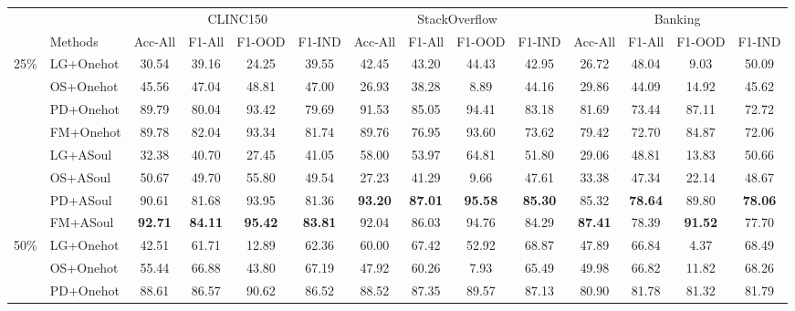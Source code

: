 \documentclass[11pt]{article}
\begin{document}
\begin{table}[t]
\small
\setlength\tabcolsep{1.5pt} %
\begin{tabular}{cl|cccc|cccc|cccc}
\toprule
\multirow{2}{*}{}  &  &\multicolumn{4}{c|}{CLINC150}  &  \multicolumn{4}{c|}{StackOverflow}  &\multicolumn{4}{c}{Banking}     \\
& Methods  & Acc-All & F1-All & F1-OOD & F1-IND &  Acc-All &   F1-All & F1-OOD & F1-IND & Acc-All &  F1-All & F1-OOD & F1-IND \\
\midrule
\multirow{8}{*}{25\%} 
  & LG+Onehot  & 30.54      & 39.16   & 24.25 & 39.55   & 42.45   & 43.20  & 44.43  & 42.95  & 26.72    & 48.04  & 9.03  & 50.09    \\
  & OS+Onehot  & 45.56      & 47.04   & 48.81 & 47.00   & 26.93   & 38.28  & 8.89   & 44.16  & 29.86    & 44.09  & 14.92 & 45.62   \\
  & PD+Onehot  & 89.79      & 80.04   & 93.42 & 79.69   & 91.53   & 85.05  & 94.41  & 83.18  & 81.69    & 73.44  & 87.11 & 72.72   \\
  & FM+Onehot  & 89.78      & 82.04   & 93.34 & 81.74   & 89.76   & 76.95  & 93.60  & 73.62  & 79.42    & 72.70  & 84.87 & 72.06    \\
\cmidrule{2-14}
  & LG+ASoul & 32.38          & 40.70  & 27.45 & 41.05    & 58.00          & 53.97          & 64.81          & 51.80          & 29.06          & 48.81       & 13.83 & 50.66   \\
  & OS+ASoul & 50.67          & 49.70  & 55.80 & 49.54    & 27.23          & 41.29          & 9.66           & 47.61          & 33.38          & 47.34     & 22.14 & 48.67     \\
  & PD+ASoul & 90.61          & 81.68  & 93.95 & 81.36    & \textbf{93.20} & \textbf{87.01} & \textbf{95.58} & \textbf{85.30} & 85.32          & \textbf{78.64} & 89.80 & \textbf{78.06}\\
  & FM+ASoul & \textbf{92.71} & \textbf{84.11} & \textbf{95.42} & \textbf{83.81} & 92.04          & 86.03   & 94.76 & 84.29   & \textbf{87.41} & 78.39     & \textbf{91.52} & 77.70     \\
\midrule
\midrule
\multirow{8}{*}{50\%} 
  & LG+Onehot & 42.51 & 61.71 & 12.89 & 62.36 & 60.00 & 67.42 & 52.92 & 68.87 & 47.89 & 66.84 & 4.37 & 68.49 \\
  & OS+Onehot & 55.44 & 66.88 & 43.80  & 67.19 & 47.92 & 60.26 & 7.93 & 65.49 & 49.98 & 66.82 & 11.82 & 68.26\\
  & PD+Onehot & 88.61 & 86.57 & 90.62 & 86.52 & 88.52 & 87.35 & 89.57 & 87.13 & 80.90 & 81.78 & 81.32 & 81.79\\

\end{tabular}
\end{table}
\end{document}
